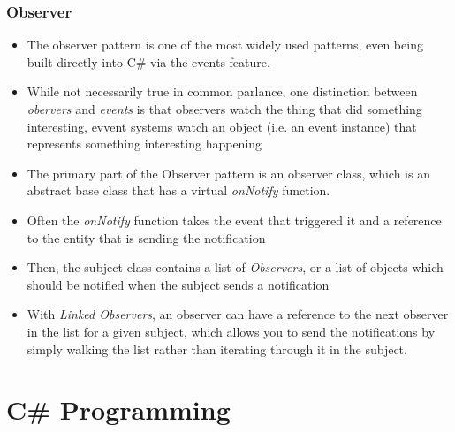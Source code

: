\documentclass{article}
\begin{document}
\subsubsection{Observer}
\begin{itemize}
    \item The observer pattern is one of the most widely used patterns, even being built directly into C\# via the events feature.
    \item While not necessarily true in common parlance, one distinction between \textit{obervers} and \textit{events} is that observers watch the thing that did something interesting, evvent systems watch an object (i.e. an event instance) that represents something interesting happening 
    \item The primary part of the Observer pattern is an observer class, which is an abstract base class that has a virtual \textit{onNotify} function.
    \item Often the \textit{onNotify} function takes the event that triggered it and a reference to the entity that is sending the notification
    \item Then, the subject class contains a list of \textit{Observers}, or a list of objects which should be notified when the subject sends a notification
    \item With \textit{Linked Observers}, an observer can have a reference to the next observer in the list for a given subject, which allows you to send the notifications by simply walking the list rather than iterating through it in the subject.
\end{itemize}

\newpage
\section{C\# Programming}
\end{document}
